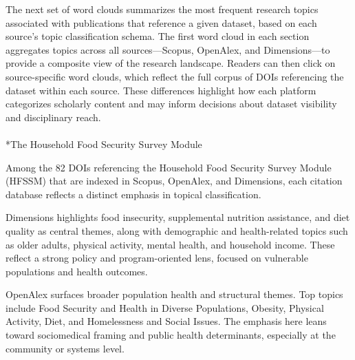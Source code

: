 \documentclass[
  letterpaper,
  DIV=11,
  numbers=noendperiod]{scrartcl}
\makeatletter
\let\oldparagraph\paragraph
\renewcommand{\paragraph}{
    \@ifstar
      \xxxParagraphStar
      \xxxParagraphNoStar
  }
\newcommand{\xxxParagraphStar}[1]{\oldparagraph*{#1}\mbox{}}
\newcommand{\xxxParagraphNoStar}[1]{\oldparagraph{#1}\mbox{}}
\makeatother
\begin{document}
The next set of word clouds summarizes the most frequent research topics
associated with publications that reference a given dataset, based on
each source's topic classification schema. The first word cloud in each
section aggregates topics across all sources---Scopus, OpenAlex, and
Dimensions---to provide a composite view of the research landscape.
Readers can then click on source-specific word clouds, which reflect the
full corpus of DOIs referencing the dataset within each source. These
differences highlight how each platform categorizes scholarly content
and may inform decisions about dataset visibility and disciplinary
reach.

\begin{tcolorbox}[enhanced jigsaw, leftrule=.75mm, colframe=quarto-callout-note-color-frame, toprule=.15mm, titlerule=0mm, colback=white, rightrule=.15mm, opacityback=0, breakable, bottomtitle=1mm, coltitle=black, colbacktitle=quarto-callout-note-color!10!white, left=2mm, toptitle=1mm, opacitybacktitle=0.6, title=\textcolor{quarto-callout-note-color}{\faInfo}\hspace{0.5em}{Additional Word Cloud Variants}, arc=.35mm, bottomrule=.15mm]

\end{tcolorbox}

\paragraph*{The Household Food Security Survey
Module}\label{the-household-food-security-survey-module-2}

Among the 82 DOIs referencing the Household Food Security Survey Module
(HFSSM) that are indexed in Scopus, OpenAlex, and Dimensions, each
citation database reflects a distinct emphasis in topical
classification.

Dimensions highlights food insecurity, supplemental nutrition
assistance, and diet quality as central themes, along with demographic
and health-related topics such as older adults, physical activity,
mental health, and household income. These reflect a strong policy and
program-oriented lens, focused on vulnerable populations and health
outcomes.

OpenAlex surfaces broader population health and structural themes. Top
topics include Food Security and Health in Diverse Populations, Obesity,
Physical Activity, Diet, and Homelessness and Social Issues. The
emphasis here leans toward sociomedical framing and public health
determinants, especially at the community or systems level.
\end{document}
